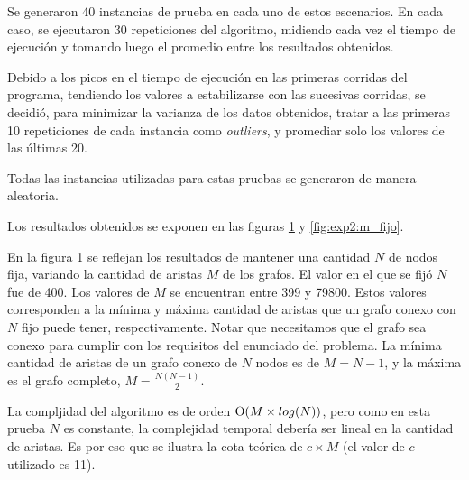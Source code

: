     Se generaron 40 instancias de prueba en cada uno de estos escenarios. En cada caso, se ejecutaron 30 repeticiones del algoritmo, midiendo cada vez el tiempo de ejecución y tomando luego el promedio entre los resultados obtenidos.

    Debido a los picos en el tiempo de ejecución en las primeras corridas del programa, tendiendo los valores a estabilizarse con las sucesivas corridas, se decidió, para minimizar la varianza de los datos obtenidos, tratar a las primeras 10 repeticiones de cada instancia como \textit{outliers}, y promediar solo los valores de las últimas 20.

    Todas las instancias utilizadas para estas pruebas se generaron de manera aleatoria. 

    Los resultados obtenidos se exponen en las figuras \ref{fig:exp2:n_fijo} y \ref{fig:exp2:m_fijo}.
    
    \newcommand\constante{11}

    En la figura \ref{fig:exp2:n_fijo} se reflejan los resultados de mantener una cantidad $N$ de nodos fija, variando la cantidad de aristas $M$ de los grafos. El valor en el que se fijó $N$ fue de 400. Los valores de $M$ se encuentran entre 399 y 79800. Estos valores corresponden a la mínima y máxima cantidad de aristas que un grafo conexo con $N$ fijo puede tener, respectivamente. Notar que necesitamos que el grafo sea conexo para cumplir con los requisitos del enunciado del problema. La mínima cantidad de aristas de un grafo conexo de $N$ nodos es de $M = N - 1$, y la máxima es el grafo completo, $M = \frac{N(N - 1)}{2}$.

    La compljidad del algoritmo es de orden $\operatorname{O}(M \times log(N))$, pero como en esta prueba $N$ es constante, la complejidad temporal debería ser lineal en la cantidad de aristas. Es por eso que se ilustra la cota teórica de $c \times M$ (el valor de $c$ utilizado es \constante). 

    \begin{figure}[H]
        \centering
        \caption{}
        \label{fig:exp2:n_fijo}
    \end{figure}

